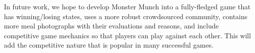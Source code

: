 In future work, we hope to develop Monster Munch into a fully-fledged game that has winning/losing states, uses a more robust crowdsourced community, contains more meal photographs with their evaluations and reasons, and include competitive game mechanics so that players can play against each other.  
This will add the competitive nature that is popular in many successful games. 








